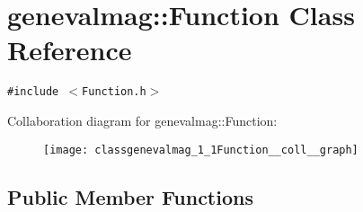 \hypertarget{classgenevalmag_1_1Function}{
\section{genevalmag::Function Class Reference}
\label{classgenevalmag_1_1Function}
}
{\tt \#include $<$Function.h$>$}

Collaboration diagram for genevalmag::Function:\nopagebreak
\begin{figure}[H]
\begin{center}
\leavevmode
\texttt{[image: classgenevalmag\_1\_1Function\_\_coll\_\_graph]}
\end{center}
\end{figure}
\subsection*{Public Member Functions}
